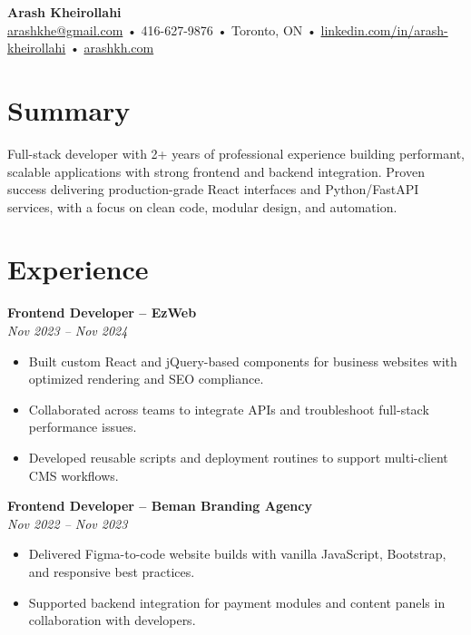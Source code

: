 \documentclass[letterpaper,11pt]{article}
\begin{document}

{\LARGE \textbf{Arash Kheirollahi}}\\
\href{mailto:arashkhe@gmail.com}{arashkhe@gmail.com} • 416-627-9876 • Toronto, ON • \href{https://linkedin.com/in/arash-kheirollahi}{linkedin.com/in/arash-kheirollahi} • \href{https://arashkh.com}{arashkh.com}

\vspace{1.2em}

\section*{Summary}
Full-stack developer with 2+ years of professional experience building performant, scalable applications with strong frontend and backend integration. Proven success delivering production-grade React interfaces and Python/FastAPI services, with a focus on clean code, modular design, and automation.

\vspace{0.6em}

\section*{Experience}
\textbf{Frontend Developer – EzWeb}\\
\textit{Nov 2023 -- Nov 2024}\\
\begin{itemize}[leftmargin=*]
  \item Built custom React and jQuery-based components for business websites with optimized rendering and SEO compliance.
  \item Collaborated across teams to integrate APIs and troubleshoot full-stack performance issues.
  \item Developed reusable scripts and deployment routines to support multi-client CMS workflows.
\end{itemize}

\vspace{0.6em}

\textbf{Frontend Developer – Beman Branding Agency}\\
\textit{Nov 2022 -- Nov 2023}\\
\begin{itemize}[leftmargin=*]
  \item Delivered Figma-to-code website builds with vanilla JavaScript, Bootstrap, and responsive best practices.
  \item Supported backend integration for payment modules and content panels in collaboration with developers.
\end{itemize}
\end{document}

